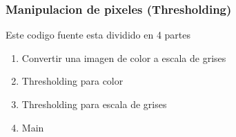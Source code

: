 \begin{frame}[fragile]
   \frametitle{Manipulacion de pixeles (Thresholding)}

    Este codigo fuente esta dividido en 4 partes

    \begin{enumerate}
        \item Convertir una imagen de color a escala de grises
        \item Thresholding para color
        \item Thresholding para escala de grises
        \item Main
    \end{enumerate}

\end{frame}
